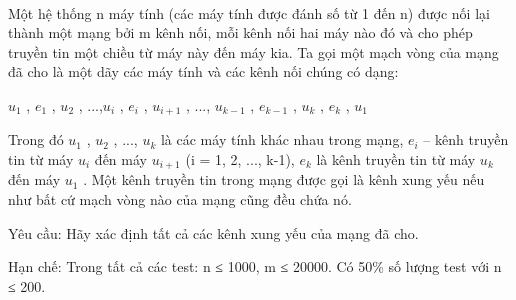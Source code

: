  

Một hệ thống n máy tính (các máy tính được đánh số từ 1 đến n) được nối lại thành một mạng bởi m kênh nối, mỗi kênh nối hai máy nào đó và cho phép truyền tin một chiều từ máy này đến máy kia. Ta gọi một mạch vòng của mạng đã cho là một dãy các máy tính và các kênh nối chúng có dạng:

$u_{1}$ , $e_{1}$ , $u_{2}$ , ...,$u_{i}$ , $e_{i}$ , $u_{i+1}$ , ..., $u_{k-1}$ , $e_{k-1}$ , $u_{k}$ , $e_{k}$ , $u_{1}$

Trong đó $u_{1}$ , $u_{2}$ , ..., $u_{k}$ là các máy tính khác nhau trong mạng, $e_{i}$ – kênh truyền tin từ máy $u_{i}$ đến máy $u_{i+1}$ (i = 1, 2, ..., k-1), $e_{k}$ là kênh truyền tin từ máy $u_{k}$ đến máy $u_{1}$ . Một kênh truyền tin trong mạng được gọi là kênh xung yếu nếu như bất cứ mạch vòng nào của mạng cũng đều chứa nó.

Yêu cầu: Hãy xác định tất cả các kênh xung yếu của mạng đã cho.

Hạn chế:
Trong tất cả các test: n ≤ 1000, m ≤ 20000. Có 50\% số lượng test với n ≤ 200.